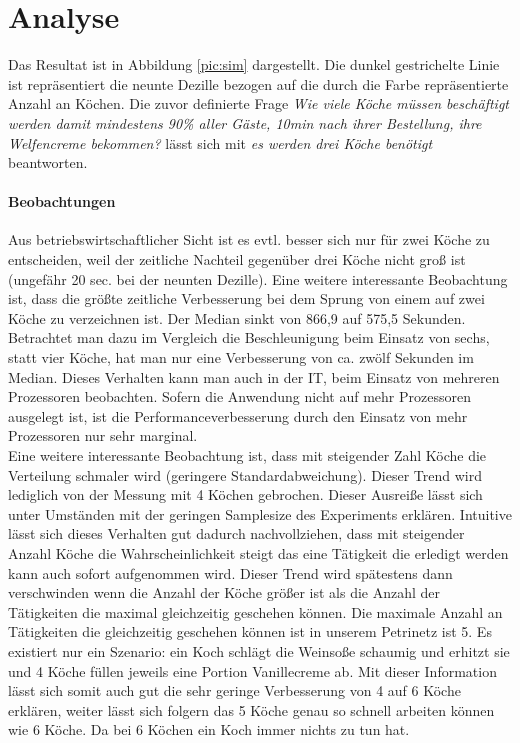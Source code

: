 \section*{Analyse} %
\label{sec:analyse}
Das Resultat ist in Abbildung \ref{pic:sim} dargestellt. Die dunkel gestrichelte Linie ist repräsentiert die neunte Dezille bezogen auf die durch die Farbe repräsentierte Anzahl an Köchen. Die zuvor definierte Frage \textit{Wie viele Köche müssen beschäftigt werden damit mindestens 90\% aller Gäste, 10min nach ihrer Bestellung, ihre Welfencreme bekommen?} lässt sich mit \textit{es werden drei Köche benötigt} beantworten.
\paragraph{Beobachtungen}
Aus betriebswirtschaftlicher Sicht ist es evtl. besser sich nur für zwei Köche zu entscheiden, weil der zeitliche Nachteil gegenüber drei Köche nicht groß ist (ungefähr 20 sec. bei der neunten Dezille). Eine weitere interessante Beobachtung ist, dass die größte zeitliche Verbesserung bei dem Sprung von einem auf zwei Köche zu verzeichnen ist. Der Median sinkt von 866,9 auf 575,5 Sekunden. Betrachtet man dazu im Vergleich die Beschleunigung beim Einsatz von sechs, statt vier Köche, hat man nur eine Verbesserung von ca. zwölf Sekunden im Median.
Dieses Verhalten kann man auch in der IT, beim Einsatz von mehreren Prozessoren beobachten. Sofern die Anwendung nicht auf mehr Prozessoren ausgelegt ist, ist die Performanceverbesserung durch den Einsatz von mehr Prozessoren nur sehr marginal. \\

Eine weitere interessante Beobachtung ist, dass mit steigender Zahl Köche die Verteilung schmaler wird (geringere Standardabweichung). Dieser Trend wird lediglich von der Messung mit 4 Köchen gebrochen. Dieser Ausreiße lässt sich unter Umständen mit der geringen Samplesize des Experiments erklären. Intuitive lässt sich dieses Verhalten gut dadurch nachvollziehen, dass mit steigender Anzahl Köche die Wahrscheinlichkeit steigt das eine Tätigkeit die erledigt werden kann auch sofort aufgenommen wird. Dieser Trend wird spätestens dann verschwinden wenn die Anzahl der Köche größer ist als die Anzahl der Tätigkeiten die maximal gleichzeitig geschehen können. Die maximale Anzahl an Tätigkeiten die gleichzeitig geschehen können ist in unserem Petrinetz ist 5. Es existiert nur ein Szenario: ein Koch schlägt die Weinsoße schaumig und erhitzt sie und 4 Köche füllen jeweils eine Portion Vanillecreme ab. Mit dieser Information lässt sich somit auch gut die sehr geringe Verbesserung von 4 auf 6 Köche erklären, weiter lässt sich folgern das 5 Köche genau so schnell arbeiten können wie 6 Köche. Da bei 6 Köchen ein Koch immer nichts zu tun hat.\\

